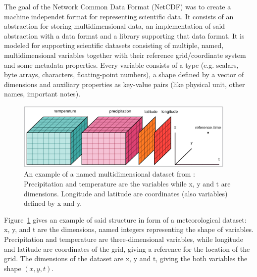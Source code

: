 The goal of the Network Common Data Format (NetCDF) was to create a machine independet format for representing scientific data. 
It consists of an abstraction for storing multidimensional data, an implementation of said abstraction with a data format and a library supporting that data format. 
It is modeled for supporting scientific datasets consisting of multiple, named, multidimensional variables together with their reference grid/coordinate system and some metadata properties.
Every variable consists of a type (e.g. scalars, byte arrays, characters, floating-point numbers), a shape defined by a vector of dimensions and auxiliary properties as key-value pairs (like physical unit, other names, important notes). \cite{rew_netcdf_1990}

\begin{figure}[htb]
  \begin{center}
    \includegraphics[width=0.95\textwidth]{figures/netcdf_visual_example.png}
  \end{center}
  \caption{An example of a named multidimensional dataset from \cite{hoyer_xarray_2017}: Precipitation and temperature are the variables while x, y and t are dimensions. Longitude and latitude are coordinates (also variables) defined by x and y.}
  \label{fig:example_dataset_structure}
\end{figure}

Figure~\ref{fig:example_dataset_structure} gives an example of said structure in form of a meteorological dataset: x, y, and t are the dimensions, named integers representing the shape of variables. 
Precipitation and temperature are three-dimensional variables, while longitude and latitude are coordinates of the grid, giving a reference for the location of the grid. The dimensions of the dataset are x, y and t, giving the both variables the shape $(x, y, t)$. \cite{hoyer_xarray_2017}



